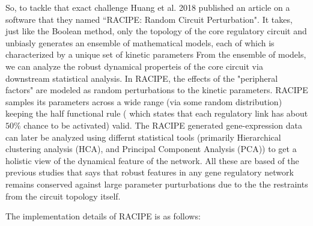 \documentclass{article}
\begin{document}
So, to tackle that exact challenge Huang et al. 2018 \cite{RACIPE} published 
an article on a software that they named ``RACIPE: Random Circuit Perturbation".
It takes, just like the Boolean method, only the topology of the core regulatory
circuit and unbiasly generates an ensemble of mathematical models, each of which 
is characterized by a unique set of kinetic parameters From the ensemble of 
models, we can analyze the robust dynamical properteis of the core circuit via 
downstream statistical analysis. In RACIPE, the effects of the "peripheral 
factors" are modeled as random perturbations to the kinetic parameters. RACIPE
samples its parameters across a wide range (via some random distribution) 
keeping the half functional rule (
which states that each regulatory link has about $50\%$ chance to be activated)
valid. The RACIPE generated gene-expression data can later be analyzed using 
differnt statistical tools (primarily Hierarchical clustering analysis (HCA), 
and Principal Component Analysis (PCA)) to get a holistic view of the dynamical 
feature of the network. All these are based of the previous studies that says 
that robust features in any gene regulatory network remains conserved against
large parameter purturbations due to the the restraints from the circuit 
topology itself. 

The implementation details of RACIPE is as follows:

 

\end{document}

